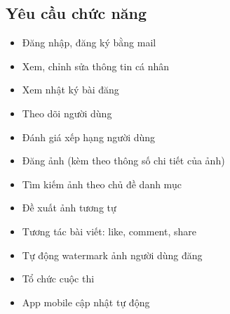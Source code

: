 \subsection{Yêu cầu chức năng}
    
\begin{itemize}
    \item Đăng nhập, đăng ký bằng mail
    \item Xem, chỉnh sửa thông tin cá nhân
    \item Xem nhật ký bài đăng
    \item Theo dõi người dùng
    \item Đánh giá xếp hạng người dùng
    \item Đăng ảnh (kèm theo thông số chi tiết của ảnh)
    \item Tìm kiếm ảnh theo chủ đề danh mục
    \item Đề xuất ảnh tương tự
    \item Tương tác bài viết: like, comment, share
    \item Tự động watermark ảnh người dùng đăng
    \item Tổ chức cuộc thi
    \item App mobile cập nhật tự động
\end{itemize}